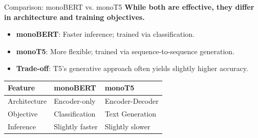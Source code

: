 \documentclass[aspectratio=169]{beamer}
\newif\ifanimated
\newcommand{\cpause}{\ifanimated\pause\fi}
\begin{document}
\begin{frame}{Comparison: monoBERT vs. monoT5}
\textbf{While both are effective, they differ in architecture and training objectives.}

\vspace{0.8em}
\begin{itemize}
    \item \textbf{monoBERT}: Faster inference; trained via classification.
    \item \textbf{monoT5}: More flexible; trained via sequence-to-sequence generation.
    \item \textbf{Trade-off}: T5's generative approach often yields slightly higher accuracy.
\end{itemize}

\vspace{1em}
\cpause
\begin{table}
\centering
\small
\begin{tabular}{lll}
\toprule
\textbf{Feature} & \textbf{monoBERT} & \textbf{monoT5} \\
\midrule
Architecture & Encoder-only & Encoder-Decoder \\
Objective & Classification & Text Generation \\
Inference & Slightly faster & Slightly slower \\
\bottomrule
\end{tabular}
\end{table}
\end{frame}




\end{document}
